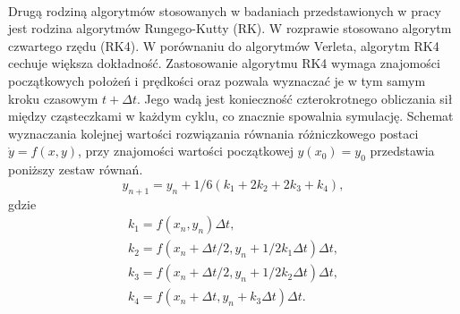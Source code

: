 \documentclass[12pt,a4paper,openright]{report} %
\begin{document}
\\
Drugą rodziną algorytmów stosowanych w badaniach przedstawionych w pracy jest rodzina algorytmów Rungego-Kutty (RK). W rozprawie stosowano algorytm czwartego rzędu (RK4). W porównaniu do algorytmów Verleta, algorytm RK4 cechuje większa dokładność. Zastosowanie algorytmu RK4 wymaga znajomości początkowych położeń i prędkości oraz pozwala wyznaczać je w tym samym kroku czasowym $t+\Delta t$. Jego wadą jest konieczność czterokrotnego obliczania sił między cząsteczkami w każdym cyklu, co znacznie spowalnia symulację. Schemat wyznaczania kolejnej wartości rozwiązania równania różniczkowego postaci $\dot{y}=f(x,y)$, przy znajomości wartości początkowej $y(x_0)=y_0$ przedstawia poniższy zestaw równań.
\begin{equation}
y_{n+1} = y_n + 1/6 (k_1 + 2k_2 + 2k_3 + k_4),
\end{equation}
gdzie
\begin{equation}
\begin{gathered}
k_1=f(x_n, y_n)\Delta t,\\
%
k_2=f(x_n+\Delta t/2,y_n+1/2 k_1 \Delta t)\Delta t,\\
%
k_3=f(x_n+\Delta t/2,y_n+1/2 k_2 \Delta t)\Delta t,\\
%
k_4=f(x_n+\Delta t,y_n+ k_3 \Delta t)\Delta t.
\end{gathered}
\end{equation}
 
%
\end{document}
